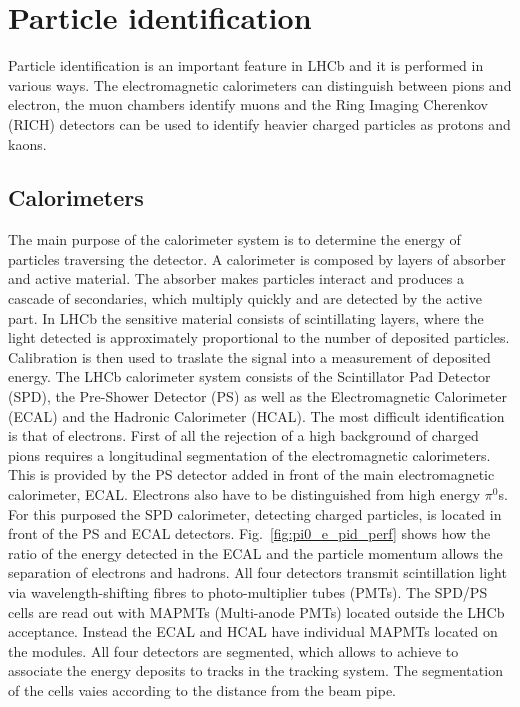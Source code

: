 \section{Particle identification}

Particle identification is an important feature in LHCb and it is performed in various ways.
The electromagnetic calorimeters can distinguish between pions and electron, the muon chambers
identify muons and the Ring Imaging Cherenkov (RICH) detectors can be used to identify 
heavier charged particles as protons and kaons.

\subsection{Calorimeters}
\label{sec:calorimeters}

The main purpose of the calorimeter system is to determine the energy of particles traversing the detector. 
A calorimeter is composed by layers of absorber and active material. The absorber makes particles
interact and produces a cascade of secondaries, which multiply quickly and are detected by the active part.
In LHCb the sensitive material consists of scintillating layers, where the light detected is approximately proportional 
to the number of deposited particles. Calibration is then used to traslate the signal into a measurement of deposited
energy. 
The LHCb calorimeter system consists of the Scintillator Pad Detector (SPD), the Pre-Shower Detector (PS) as well as
the Electromagnetic Calorimeter (ECAL) and the Hadronic Calorimeter (HCAL).
The most difficult identification is that of electrons. First of all the rejection of a high background
of charged pions requires a longitudinal segmentation of the electromagnetic calorimeters. This is provided by
the PS detector added in front of the main electromagnetic calorimeter, ECAL. Electrons also have to be 
distinguished from high energy $\pi^0$s. For this purposed the SPD calorimeter, detecting charged particles,
is located in front of the PS and ECAL detectors. Fig.~\ref{fig:pi0_e_pid_perf} shows how the ratio of the
energy detected in the ECAL and the particle momentum allows the separation of electrons and hadrons.
All four detectors transmit scintillation light via
wavelength-shifting fibres to photo-multiplier tubes (PMTs). The SPD/PS cells are read out with MAPMTs 
(Multi-anode PMTs) located outside the LHCb acceptance. Instead the ECAL and HCAL have individual MAPMTs
located on the modules. All four detectors are segmented, which allows to achieve to associate the energy
deposits to tracks in the tracking system. The segmentation of the cells vaies according to the distance from the beam pipe.

